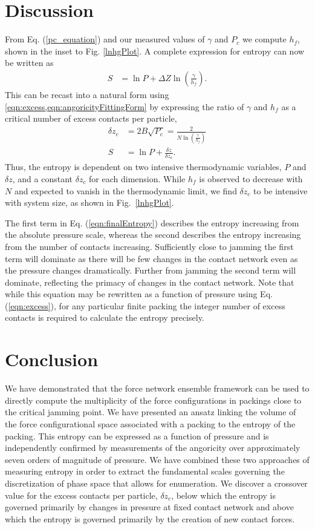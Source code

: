 \section{Discussion}
From Eq. (\ref{pc_equation}) and our measured values of $\gamma$ and $P_c$ we compute $h_f$, shown in the inset to Fig. \ref{lnhgPlot}. A complete expression for entropy can now be written as
%
\begin{align}
S &= \ln P + \Delta Z \ln\left(\frac{\gamma}{h_f}\right).
\end{align}
This can be recast into a natural form using \cref{eqn:excess,eqn:angoricityFittingForm} by expressing the ratio of $\gamma$ and $h_f$ as a critical number of excess contacts per particle, 
\begin{align}
\delta z_c &= 2B \sqrt{P_c}= \frac{2}{N\ln\left( \frac{\gamma}{h_f}\right)} \\
S &= \ln P + \frac{\delta z}{\delta z_c}. \label{eqn:finalEntropy}
\end{align}
%
Thus, the entropy is dependent on two intensive thermodynamic variables, $P$ and $\delta z$, and a constant $\delta z_c$ for each dimension. While $h_f$ is observed to decrease with $N$ and expected to vanish in the thermodynamic limit, we find $\delta z_c$ to be intensive with system size, as shown in Fig.~\ref{lnhgPlot}.

The first term in Eq. (\ref{eqn:finalEntropy}) describes the entropy increasing from the absolute pressure scale, whereas the second describes the entropy increasing from the number of contacts increasing. Sufficiently close to jamming the first term will dominate as there will be few changes in the contact network even as the pressure changes dramatically. Further from jamming the second term will dominate, reflecting the primacy of changes in the contact network.
Note that while this equation may be rewritten as a function of pressure using Eq. (\ref{eqn:excess}), for any particular finite packing the integer number of excess contacts is required to calculate the entropy precisely.


\section{Conclusion} We have demonstrated that the force network ensemble framework can be used to directly compute the multiplicity of the force configurations in packings close to the critical jamming point. We have presented an ansatz linking the volume of the force configurational space associated with a packing to the entropy of the packing.  This entropy can be expressed as a function of pressure and is independently confirmed by measurements of the angoricity over approximately seven orders of magnitude of pressure.  We have combined these two approaches of measuring entropy in order to extract the fundamental scales governing the discretization of phase space that allows for enumeration. We discover a crossover value for the excess contacts per particle, $\delta z_c$, below which the entropy is governed primarily by changes in pressure at fixed contact network and above which the entropy is governed primarily by the creation of new contact forces.

